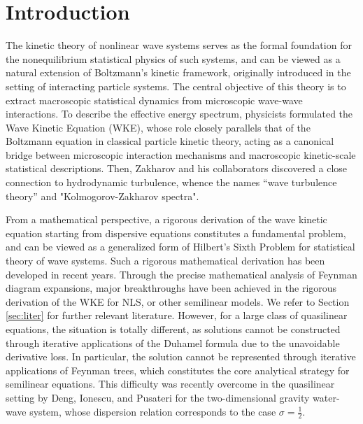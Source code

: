 \documentclass[UTF-8,reqno]{amsart}
\numberwithin{equation}{section}
\theoremstyle{definition}
\begin{document}
\maketitle


\tableofcontents 


 \section{Introduction}
 
 
The kinetic theory of nonlinear wave systems serves as the formal foundation for the nonequilibrium statistical physics of such systems, and can be viewed as a natural extension of Boltzmann’s kinetic framework, originally introduced in the setting of interacting particle systems. The central objective of this theory is to extract macroscopic statistical dynamics from microscopic wave-wave interactions. To describe the effective energy spectrum, physicists formulated the Wave Kinetic Equation (WKE), whose role closely parallels that of the Boltzmann equation in classical particle kinetic theory, acting as a canonical bridge between microscopic interaction mechanisms and macroscopic kinetic-scale statistical descriptions. Then, Zakharov and his collaborators discovered a close connection to  hydrodynamic
 turbulence, whence the names “wave turbulence theory” and "Kolmogorov-Zakharov spectra". 

From a mathematical perspective, a rigorous derivation of the wave kinetic equation starting from dispersive equations constitutes a fundamental problem, and can be viewed as a  generalized form of Hilbert’s Sixth Problem for  statistical theory of wave systems.
Such a rigorous mathematical derivation has been developed in recent years. Through the precise mathematical analysis of Feynman diagram expansions, major breakthroughs have been achieved in the rigorous derivation of the WKE for NLS, or other semilinear models. We refer to Section \ref{sec:liter} for further relevant literature. However, for a large class of quasilinear equations, the situation is totally different, as solutions cannot be constructed through iterative applications of the Duhamel formula due to the unavoidable derivative loss.  In particular, the solution cannot be represented through iterative applications of  Feynman trees, which constitutes the core analytical strategy for semilinear equations.  This difficulty was recently overcome in the quasilinear setting by
Deng, Ionescu, and Pusateri \cite{DIP25a,DIP25} for the two-dimensional
gravity water-wave system, whose dispersion relation
corresponds to the case $\sigma=\frac12$.
\end{document}
